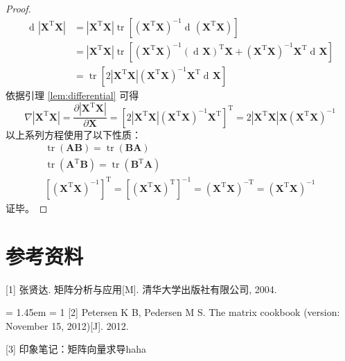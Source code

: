 \documentclass[UTF8,space=auto]{ctexart} %
\DeclareMathOperator{\diff}{d\!}
\begin{document}
\begin{proof}
\begin{align*}
	\diff \left| \mathbf{X}^{\mathrm{T}}\mathbf{X} \right|
	&= \left| \mathbf{X}^{\mathrm{T}}\mathbf{X} \right| \operatorname{tr} \left[ \left( \mathbf{X}^{\mathrm{T}}\mathbf{X} \right)^{-1} \diff\left( \mathbf{X}^{\mathrm{T}}\mathbf{X} \right) \right] \\
	&= \left| \mathbf{X}^{\mathrm{T}}\mathbf{X} \right| \operatorname{tr} \left[ \left( \mathbf{X}^{\mathrm{T}}\mathbf{X} \right)^{-1} \left(\diff\mathbf{X}\right)^{\mathrm{T}} \mathbf{X} + \left( \mathbf{X}^{\mathrm{T}}\mathbf{X} \right)^{-1} \mathbf{X}^{\mathrm{T}} \diff\mathbf{X} \right] \\
	&= \operatorname{tr} \left[ 2\left| \mathbf{X}^{\mathrm{T}}\mathbf{X} \right| \left( \mathbf{X}^{\mathrm{T}}\mathbf{X} \right)^{-1} \mathbf{X}^{\mathrm{T}} \diff\mathbf{X} \right]
\end{align*}
依据引理 \ref{lem:differential} 可得
\[
\nabla \left| \mathbf{X}^{\mathrm{T}}\mathbf{X} \right|
= \frac{\partial\left|\mathbf{X}^{\mathrm{T}} \mathbf{X}\right|}{\partial \mathbf{X}}
= \left[ 2\left| \mathbf{X}^{\mathrm{T}}\mathbf{X} \right| \left( \mathbf{X}^{\mathrm{T}}\mathbf{X} \right)^{-1} \mathbf{X}^{\mathrm{T}} \right]^{\mathrm{T}}
=2\left|\mathbf{X}^{\mathrm{T}} \mathbf{X}\right| \mathbf{X}\left(\mathbf{X}^{\mathrm{T}} \mathbf{X}\right)^{-1}
\]
以上系列方程使用了以下性质：
\begin{gather*}
\operatorname{tr}(\mathbf{AB})=\operatorname{tr}(\mathbf{BA}) \\
\operatorname{tr}\left(\mathbf{A}^{\mathrm{T}} \mathbf{B}\right)=\operatorname{tr}\left(\mathbf{B}^{\mathrm{T}} \mathbf{A}\right) \\
\left[\left( \mathbf{X}^{\mathrm{T}}\mathbf{X} \right)^{-1}\right]^{\mathrm{T}}=\left[\left(\mathbf{X}^{\mathrm{T}}\mathbf{X}\right)^{\mathrm{T}}\right]^{-1}= \left(\mathbf{X}^{\mathrm{T}}\mathbf{X}\right)^{-\mathrm{T}} =\left(\mathbf{X}^{\mathrm{T}}\mathbf{X}\right)^{-1}
\end{gather*}
证毕。
\end{proof}


\section{参考资料}
\setlength{\parindent}{0em}
[1] 张贤达. 矩阵分析与应用[M]. 清华大学出版社有限公司, 2004.

\hangindent = 1.45em \hangafter = 1
[2] Petersen K B, Pedersen M S. The matrix cookbook (version: November 15, 2012)[J]. 2012.

[3] 印象笔记：矩阵向量求导haha
\end{document}
